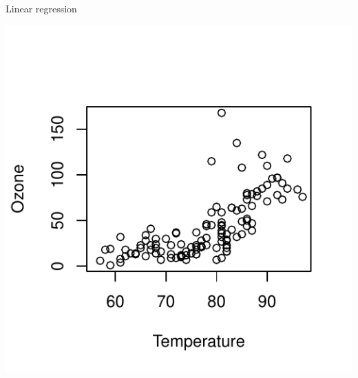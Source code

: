 \documentclass[10pt,xcolor=dvipsnames]{beamer}\usepackage[]{graphicx}\usepackage[]{color}
\makeatletter
\def\maxwidth{ %
  \ifdim\Gin@nat@width>\linewidth
    \linewidth
  \else
    \Gin@nat@width
  \fi
}
\newenvironment{knitrout}{}{} %
\makeatother
\begin{document}
\begin{frame}[fragile]{Linear regression}

\begin{knitrout}
\color{fgcolor}
\includegraphics[width=\maxwidth]{figure/lmModPlot-1} 

\end{knitrout}
\end{frame}
\end{document}
